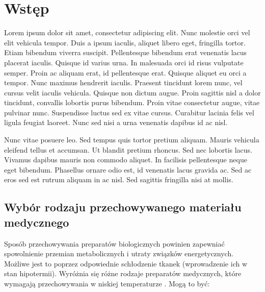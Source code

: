 \section{Wstęp}
Lorem ipsum dolor sit amet, consectetur adipiscing elit. Nunc molestie orci vel elit vehicula tempor. Duis a ipsum iaculis, aliquet libero eget, fringilla tortor. Etiam bibendum viverra suscipit. Pellentesque bibendum erat venenatis lacus placerat iaculis. Quisque id varius urna. In malesuada orci id risus vulputate semper. Proin ac aliquam erat, id pellentesque erat. Quisque aliquet eu orci a tempor. Nunc maximus hendrerit iaculis. Praesent tincidunt lorem nunc, vel cursus velit iaculis vehicula. Quisque non dictum augue. Proin sagittis nisl a dolor tincidunt, convallis lobortis purus bibendum. Proin vitae consectetur augue, vitae pulvinar nunc. Suspendisse luctus sed ex vitae cursus. Curabitur lacinia felis vel ligula feugiat laoreet. Nunc sed nisi a urna venenatis dapibus id ac nisl.

Nunc vitae posuere leo. Sed tempus quis tortor pretium aliquam. Mauris vehicula eleifend tellus et accumsan. Ut blandit pretium rhoncus. Sed nec lobortis lacus. Vivamus dapibus mauris non commodo aliquet. In facilisis pellentesque neque eget bibendum. Phasellus ornare odio est, id venenatis lacus gravida ac. Sed ac eros sed est rutrum aliquam in ac nisl. Sed sagittis fringilla nisi at mollis.



\subsection{Wybór rodzaju przechowywanego materiału medycznego}
Sposób przechowywania preparatów biologicznych powinien zapewniać spowolnienie przemian metabolicznych i utraty związków energetycznych. Możliwe jest to poprzez odpowiednie schłodzenie tkanek (wprowadzenie ich w stan hipotermii). 
Wyróżnia się różne rodzaje preparatów medycznych, które wymagają przechowywania w niskiej temperaturze \cite{Volmer2016}. Mogą to być:

